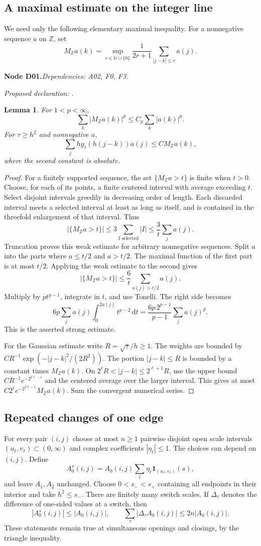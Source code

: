 \documentclass[11pt]{article}
\newtheorem{lemma}[theorem]{Lemma}
\theoremstyle{remark}\newtheorem{remark}[theorem]{Remark}
\newcommand{\Z}{\mathbb Z}\newcommand{\N}{\mathbb N}
\newcommand{\dd}{\,\mathrm d}\newcommand{\tr}{\operatorname{tr}}
\newcommand{\one}{\mathbf1}
\newcommand{\bpnode}[3]{\par\Needspace{5\baselineskip}\noindent\textbf{Node #1.}\quad\textit{Dependencies: #2.}\par\noindent\textit{Proposed declaration:} \texttt{\detokenize{#3}}.\par\smallskip}
\begin{document}
\subsection{A maximal estimate on the integer line}
We need only the following elementary maximal inequality. For a nonnegative sequence $a$ on $\Z$, set
\[
 M_{\Z}a(k)=\sup_{r\in\N\cup\{0\}}\frac1{2r+1}\sum_{|j-k|\leq r}a(j).
\]
\bpnode{D01}{A02, F0, F3}{integer_maximal_bounds}
\begin{lemma}\label{lem:maximal}
For $1<p<\infty$,
\[
 \sum_k|M_{\Z}a(k)|^p\leq C_p\sum_k|a(k)|^p.
\]
For $\tau\geq h^2$ and nonnegative $a$,
\[
 \sum_j h g_\tau(h(j-k))a(j)\leq C M_{\Z}a(k),
\]
where the second constant is absolute.
\end{lemma}
\begin{proof}
For a finitely supported sequence, the set $\{M_{\Z}a>t\}$ is finite when $t>0$. Choose, for each of its points, a finite centered interval with average exceeding $t$. Select disjoint intervals greedily in decreasing order of length. Each discarded interval meets a selected interval at least as long as itself, and is contained in the threefold enlargement of that interval. Thus
\[
 |\{M_{\Z}a>t\}|\leq3\sum_{I\text{ selected}}|I|
 \leq\frac3t\sum_j a(j).
\]
Truncation proves this weak estimate for arbitrary nonnegative sequences. Split $a$ into the parts where $a\leq t/2$ and $a>t/2$. The maximal function of the first part is at most $t/2$. Applying the weak estimate to the second gives
\[
 |\{M_{\Z}a>t\}|\leq\frac6t\sum_{a(j)>t/2}a(j).
\]
Multiply by $pt^{p-1}$, integrate in $t$, and use Tonelli. The right side becomes
\[
 6p\sum_j a(j)\int_0^{2a(j)}t^{p-2}\dd t
 =\frac{6p\,2^{p-1}}{p-1}\sum_j a(j)^p.
\]
This is the asserted strong estimate.

For the Gaussian estimate write $R=\sqrt\tau/h\geq1$. The weights are bounded by $C R^{-1}\exp(-|j-k|^2/(2R^2))$. The portion $|j-k|\leq R$ is bounded by a constant times $M_{\Z}a(k)$. On $2^\ell R<|j-k|\leq2^{\ell+1}R$, use the upper bound $C R^{-1}e^{-2^{2\ell-1}}$ and the centered average over the larger interval. This gives at most $C2^\ell e^{-2^{2\ell-1}}M_{\Z}a(k)$. Sum the convergent numerical series.
\end{proof}

\subsection{Repeated changes of one edge}
For every pair $(i,j)$ choose at most $n\geq1$ pairwise disjoint open scale intervals $(u_\ell,v_\ell)\subset(0,\infty)$ and complex coefficients $|\eta_\ell|\leq1$. The choices can depend on $(i,j)$. Define
\[
 A_0^s(i,j)=A_0(i,j)\sum_\ell\eta_\ell\one_{(u_\ell,v_\ell)}(s),
\]
and leave $A_1,A_2$ unchanged. Choose $0<s_-<s_+$ containing all endpoints in their interior and take $h^2\leq s_-$. There are finitely many switch scales. If $\Delta_\tau$ denotes the difference of one-sided values at a switch, then
\[
 |A_0^s(i,j)|\leq|A_0(i,j)|,\qquad
 \sum_\tau|\Delta_\tau A_0(i,j)|\leq2n|A_0(i,j)|.
\]
These statements remain true at simultaneous openings and closings, by the triangle inequality.
\end{document}
